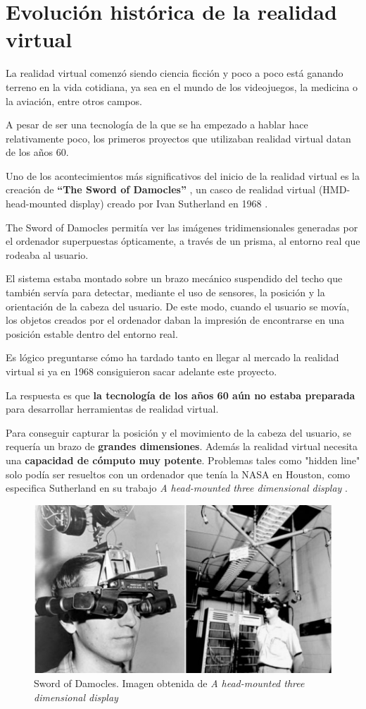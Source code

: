 \documentclass[twoside, 11pt]{epstfg}
\begin{document}
\section{Evolución histórica de la realidad virtual}
La realidad virtual comenzó siendo ciencia ficción y poco a poco está ganando terreno en la vida cotidiana, ya sea en el mundo de los videojuegos, la medicina o la aviación, entre otros campos.

A pesar de ser una tecnología de la que se ha empezado a hablar hace relativamente poco, los primeros proyectos que utilizaban realidad virtual datan de los años 60.

Uno de los  acontecimientos más significativos del inicio de la realidad virtual es la creación de \textbf{“The Sword of Damocles”} , un casco de realidad virtual (HMD- head-mounted display)  creado por Ivan Sutherland en 1968 \cite{Sutherland}.

The Sword of Damocles permitía ver las imágenes tridimensionales generadas por el
ordenador superpuestas ópticamente, a través de un prisma, al entorno real que rodeaba al usuario.

 El sistema estaba montado sobre un brazo mecánico suspendido del techo que también servía para detectar, mediante el uso de sensores, la posición y la orientación de la cabeza del usuario. De este modo, cuando el usuario se movía, los objetos creados por el ordenador daban la impresión de encontrarse en una posición estable dentro del entorno real.

Es lógico preguntarse cómo ha tardado tanto en llegar al mercado la realidad virtual si ya en 1968 consiguieron sacar adelante este proyecto.

La respuesta es que \textbf{la tecnología de los años 60 aún no estaba preparada} para desarrollar herramientas de realidad virtual.

Para conseguir capturar la posición y el movimiento de la cabeza del usuario, se requería un brazo de \textbf{grandes dimensiones}.
Además la realidad virtual necesita una \textbf{capacidad de cómputo muy potente}. Problemas tales como "hidden line" solo podía ser resueltos con un ordenador que tenía la NASA en Houston, como especifica Sutherland en su trabajo \textit{A head-mounted three dimensional display} \cite{Sutherland}. 

\begin{figure}[h]
	\centerline{
		\mbox{\includegraphics[width=.80\textwidth]{images/SwordOfDamocles.jpg}}
	}
	\caption{Sword of Damocles. Imagen obtenida de \textit{A head-mounted three dimensional display} \cite{Sutherland}}
	
\end{figure}
\end{document}
